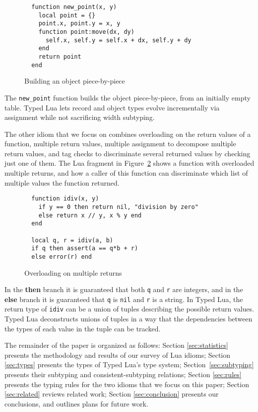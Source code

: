 \documentclass[10pt]{sigplanconf}
\begin{document}
\begin{figure}[t]
{\footnotesize
\begin{verbatim}
  function new_point(x, y)
    local point = {}
    point.x, point.y = x, y
    function point:move(dx, dy)
      self.x, self.y = self.x + dx, self.y + dy
    end
    return point
  end
\end{verbatim}
}
\caption{Building an object piece-by-piece}
\label{fig:newpoint}
\end{figure}

The {\tt new\_point} function builds the object piece-by-piece,
from an initially empty table. Typed Lua
lets record and object types evolve incrementally 
via assignment while not sacrificing width subtyping.

The other idiom that we focus on combines overloading on the return values of a function, multiple return values, multiple assignment
to decompose multiple return values,
and tag checks to discriminate several returned values
by checking just one of them. The Lua fragment in Figure~\ref{fig:over} shows a function with overloaded multiple
returns, and how a caller of this function can discriminate
which list of multiple values the function returned.

\begin{figure}[t]
{\footnotesize
\begin{verbatim}
  function idiv(x, y)
    if y == 0 then return nil, "division by zero"
    else return x // y, x % y end 
  end
  
  local q, r = idiv(a, b)
  if q then assert(a == q*b + r)
  else error(r) end
\end{verbatim}
}
\caption{Overloading on multiple returns}
\label{fig:over}
\end{figure}

In the {\bf then} branch it is guaranteed that both {\tt q}
and {\tt r} are integers, and in the {\bf else} branch it is
guaranteed that {\tt q} is {\tt nil} and {\tt r} is a string.
In Typed Lua, the return type of {\tt idiv} can be a union of
tuples describing the possible return values. Typed Lua deconstructs unions of tuples in a way that the dependencies between the types of each value in the tuple can be tracked.

The remainder of the paper is organized as follows:
Section \ref{sec:statistics} presents the methodology and results of
our survey of Lua idioms;
Section \ref{sec:types} presents the types of Typed Lua's
type system; Section~\ref{sec:subtyping} presents
their subtyping and consistent-subtyping relations;
Section \ref{sec:rules} presents the typing rules
for the two idioms that we focus on this paper;
Section \ref{sec:related} reviews related work;
Section \ref{sec:conclusion} presents our conclusions,
and outlines plans for future work.
\end{document}

